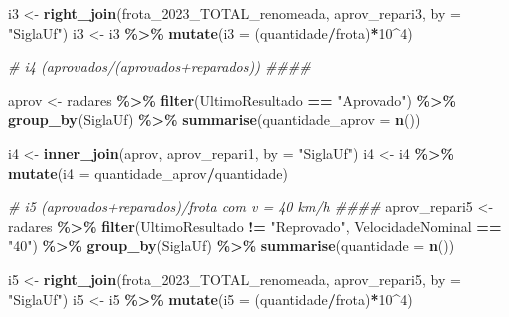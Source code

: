 \documentclass[
]{book}
\newenvironment{Shaded}{\begin{snugshade}}{\end{snugshade}}
\newcommand{\AttributeTok}[1]{\textcolor[rgb]{0.13,0.29,0.53}{#1}}
\newcommand{\CommentTok}[1]{\textcolor[rgb]{0.56,0.35,0.01}{\textit{#1}}}
\newcommand{\DecValTok}[1]{\textcolor[rgb]{0.00,0.00,0.81}{#1}}
\newcommand{\FunctionTok}[1]{\textcolor[rgb]{0.13,0.29,0.53}{\textbf{#1}}}
\newcommand{\NormalTok}[1]{#1}
\newcommand{\OtherTok}[1]{\textcolor[rgb]{0.56,0.35,0.01}{#1}}
\newcommand{\SpecialCharTok}[1]{\textcolor[rgb]{0.81,0.36,0.00}{\textbf{#1}}}
\newcommand{\StringTok}[1]{\textcolor[rgb]{0.31,0.60,0.02}{#1}}
\begin{document}
\begin{Shaded}
\begin{Highlighting}[]
\NormalTok{i3 }\OtherTok{\textless{}{-}} \FunctionTok{right\_join}\NormalTok{(frota\_2023\_TOTAL\_renomeada, aprov\_repari3, }\AttributeTok{by =} \StringTok{"SiglaUf"}\NormalTok{)}
\NormalTok{i3 }\OtherTok{\textless{}{-}}\NormalTok{ i3 }\SpecialCharTok{\%\textgreater{}\%} 
  \FunctionTok{mutate}\NormalTok{(}\AttributeTok{i3 =}\NormalTok{ (quantidade}\SpecialCharTok{/}\NormalTok{frota)}\SpecialCharTok{*}\DecValTok{10}\SpecialCharTok{\^{}}\DecValTok{4}\NormalTok{)}

\CommentTok{\# i4 (aprovados/(aprovados+reparados)) \#\#\#\#}

\NormalTok{aprov }\OtherTok{\textless{}{-}}\NormalTok{ radares }\SpecialCharTok{\%\textgreater{}\%} 
  \FunctionTok{filter}\NormalTok{(UltimoResultado }\SpecialCharTok{==} \StringTok{"Aprovado"}\NormalTok{) }\SpecialCharTok{\%\textgreater{}\%} 
  \FunctionTok{group\_by}\NormalTok{(SiglaUf) }\SpecialCharTok{\%\textgreater{}\%} 
  \FunctionTok{summarise}\NormalTok{(}\AttributeTok{quantidade\_aprov =} \FunctionTok{n}\NormalTok{())}


\NormalTok{i4 }\OtherTok{\textless{}{-}} \FunctionTok{inner\_join}\NormalTok{(aprov, aprov\_repari1, }\AttributeTok{by =} \StringTok{"SiglaUf"}\NormalTok{)}
\NormalTok{i4 }\OtherTok{\textless{}{-}}\NormalTok{ i4 }\SpecialCharTok{\%\textgreater{}\%} 
  \FunctionTok{mutate}\NormalTok{(}\AttributeTok{i4 =}\NormalTok{ quantidade\_aprov}\SpecialCharTok{/}\NormalTok{quantidade)}

\CommentTok{\# i5 (aprovados+reparados)/frota com v = 40 km/h \#\#\#\#}
\NormalTok{aprov\_repari5 }\OtherTok{\textless{}{-}}\NormalTok{ radares }\SpecialCharTok{\%\textgreater{}\%} 
  \FunctionTok{filter}\NormalTok{(UltimoResultado }\SpecialCharTok{!=} \StringTok{"Reprovado"}\NormalTok{,}
\NormalTok{         VelocidadeNominal }\SpecialCharTok{==} \StringTok{"40"}\NormalTok{) }\SpecialCharTok{\%\textgreater{}\%} 
  \FunctionTok{group\_by}\NormalTok{(SiglaUf) }\SpecialCharTok{\%\textgreater{}\%} 
  \FunctionTok{summarise}\NormalTok{(}\AttributeTok{quantidade =} \FunctionTok{n}\NormalTok{())}


\NormalTok{i5 }\OtherTok{\textless{}{-}} \FunctionTok{right\_join}\NormalTok{(frota\_2023\_TOTAL\_renomeada, aprov\_repari5, }\AttributeTok{by =} \StringTok{"SiglaUf"}\NormalTok{)}
\NormalTok{i5 }\OtherTok{\textless{}{-}}\NormalTok{ i5 }\SpecialCharTok{\%\textgreater{}\%} 
  \FunctionTok{mutate}\NormalTok{(}\AttributeTok{i5 =}\NormalTok{ (quantidade}\SpecialCharTok{/}\NormalTok{frota)}\SpecialCharTok{*}\DecValTok{10}\SpecialCharTok{\^{}}\DecValTok{4}\NormalTok{)}


\end{Highlighting}
\end{Shaded}
\end{document}

